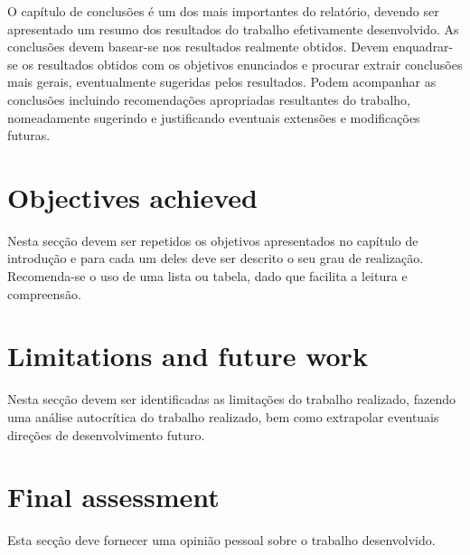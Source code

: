 
O capítulo de conclusões é um dos mais importantes do relatório, devendo ser apresentado um resumo dos resultados do trabalho efetivamente desenvolvido. As conclusões devem basear-se nos resultados realmente obtidos. Devem enquadrar-se os resultados obtidos com os objetivos enunciados e procurar extrair conclusões mais gerais, eventualmente sugeridas pelos resultados. Podem acompanhar as conclusões incluindo recomendações apropriadas resultantes do trabalho, nomeadamente sugerindo e justificando eventuais extensões e modificações futuras.

\section{Objectives achieved}
Nesta secção devem ser repetidos os objetivos apresentados no capítulo de introdução e para cada um deles deve ser descrito o seu grau de realização. Recomenda-se o uso de uma lista ou tabela, dado que facilita a leitura e compreensão.

\section{Limitations and future work}
Nesta secção devem ser identificadas as limitações do trabalho realizado, fazendo uma análise autocrítica do trabalho realizado, bem como extrapolar eventuais direções de desenvolvimento futuro.

\section{Final assessment}
Esta secção deve fornecer uma opinião pessoal sobre o trabalho desenvolvido.

